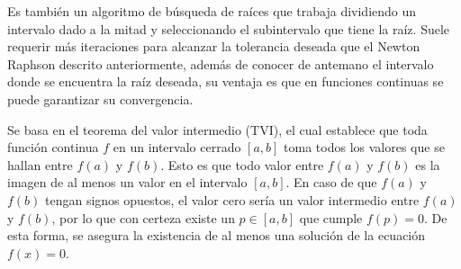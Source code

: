 \par Es también un algoritmo de búsqueda de raíces que trabaja dividiendo un intervalo dado a la mitad y seleccionando el subintervalo que tiene la raíz. Suele requerir más iteraciones para alcanzar la tolerancia deseada que el Newton Raphson descrito anteriormente, además de conocer de antemano el intervalo donde se encuentra la raíz deseada, su ventaja es que en funciones continuas se puede garantizar su convergencia.
\par Se basa en el teorema del valor intermedio (TVI), el cual establece que toda función continua $f$ en un intervalo cerrado $[a,b]$ toma todos los valores que se hallan entre $f(a)$ y $f(b)$. 
Esto es que todo valor entre $f(a)$ y $f(b)$ es la imagen de al menos un valor en el intervalo $[a,b]$. En caso de que $f(a)$ y $f(b)$ tengan signos opuestos, el valor cero sería un valor intermedio entre $f(a)$ y $f(b)$, por lo que con certeza existe un  $p\in [a,b]$ que cumple  $f(p)=0$. 
De esta forma, se asegura la existencia de al menos una solución de la ecuación $f(x)=0$.